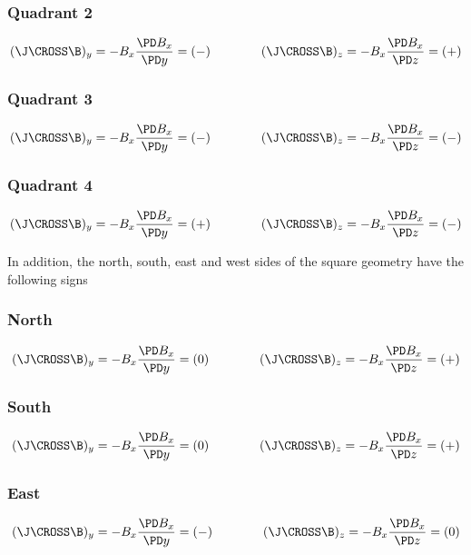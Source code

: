 \documentclass[11pt]{article}
\begin{document}
\subsubsection{Quadrant 2}
\begin{equation}
	(\J \CROSS \B)_y = - B_x \frac{\PD B_x}{\PD y} = (-)
	\qquad \qquad
	(\J \CROSS \B)_z = - B_x \frac{\PD B_x}{\PD z} = (+)
\end{equation}
\subsubsection{Quadrant 3}
\begin{equation}
	(\J \CROSS \B)_y = - B_x \frac{\PD B_x}{\PD y} = (-)
	\qquad \qquad
	(\J \CROSS \B)_z = - B_x \frac{\PD B_x}{\PD z} = (-)
\end{equation}
\subsubsection{Quadrant 4}
\begin{equation}
	(\J \CROSS \B)_y = - B_x \frac{\PD B_x}{\PD y} = (+)
	\qquad \qquad
	(\J \CROSS \B)_z = - B_x \frac{\PD B_x}{\PD z} = (-)
\end{equation}

In addition, the north, south, east and west sides of the square geometry have the following signs
\subsubsection{North}
\begin{equation}
	(\J \CROSS \B)_y = - B_x \frac{\PD B_x}{\PD y} = (0)
	\qquad \qquad
	(\J \CROSS \B)_z = - B_x \frac{\PD B_x}{\PD z} = (+)
\end{equation}

\subsubsection{South}
\begin{equation}
	(\J \CROSS \B)_y = - B_x \frac{\PD B_x}{\PD y} = (0)
	\qquad \qquad
	(\J \CROSS \B)_z = - B_x \frac{\PD B_x}{\PD z} = (+)
\end{equation}
\subsubsection{East}
\begin{equation}
	(\J \CROSS \B)_y = - B_x \frac{\PD B_x}{\PD y} = (-)
	\qquad \qquad
	(\J \CROSS \B)_z = - B_x \frac{\PD B_x}{\PD z} = (0)
\end{equation}
\end{document}
